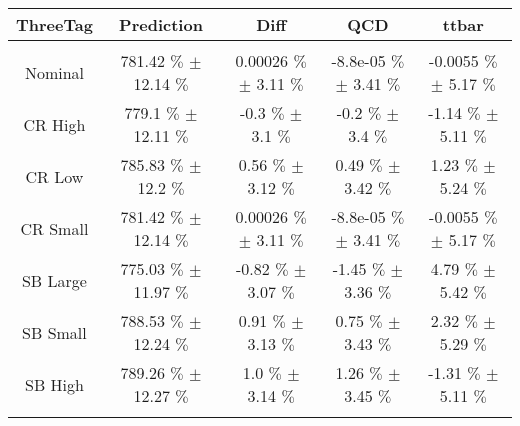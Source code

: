 \begin{footnotesize} 
\begin{tabular}{c|c|c|c|c} 
 ThreeTag & Prediction & Diff & QCD & ttbar \\ 
\hline\hline 
& & & & \\ 
Nominal & 781.42 $\%$  $\pm$ 12.14 $\%$  & 0.00026 $\%$  $\pm$ 3.11 $\%$  & -8.8e-05 $\%$  $\pm$ 3.41 $\%$  & -0.0055 $\%$  $\pm$ 5.17 $\%$ \\ 
CR High & 779.1 $\%$  $\pm$ 12.11 $\%$  & -0.3 $\%$  $\pm$ 3.1 $\%$  & -0.2 $\%$  $\pm$ 3.4 $\%$  & -1.14 $\%$  $\pm$ 5.11 $\%$ \\ 
CR Low & 785.83 $\%$  $\pm$ 12.2 $\%$  & 0.56 $\%$  $\pm$ 3.12 $\%$  & 0.49 $\%$  $\pm$ 3.42 $\%$  & 1.23 $\%$  $\pm$ 5.24 $\%$ \\ 
CR Small & 781.42 $\%$  $\pm$ 12.14 $\%$  & 0.00026 $\%$  $\pm$ 3.11 $\%$  & -8.8e-05 $\%$  $\pm$ 3.41 $\%$  & -0.0055 $\%$  $\pm$ 5.17 $\%$ \\ 
SB Large & 775.03 $\%$  $\pm$ 11.97 $\%$  & -0.82 $\%$  $\pm$ 3.07 $\%$  & -1.45 $\%$  $\pm$ 3.36 $\%$  & 4.79 $\%$  $\pm$ 5.42 $\%$ \\ 
SB Small & 788.53 $\%$  $\pm$ 12.24 $\%$  & 0.91 $\%$  $\pm$ 3.13 $\%$  & 0.75 $\%$  $\pm$ 3.43 $\%$  & 2.32 $\%$  $\pm$ 5.29 $\%$ \\ 
SB High & 789.26 $\%$  $\pm$ 12.27 $\%$  & 1.0 $\%$  $\pm$ 3.14 $\%$  & 1.26 $\%$  $\pm$ 3.45 $\%$  & -1.31 $\%$  $\pm$ 5.11 $\%$ \\ 
& & & & \\ 
\hline\hline 
\end{tabular} 
\end{footnotesize} 
\newline 
